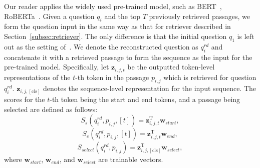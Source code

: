 Our reader applies the widely used pre-trained model, such as BERT~\cite{devlin2018bert}, RoBERTa~\cite{liu2019roberta}. Given a question $q_i$ and the top $T$ previously retrieved passages, we form the question input in the same way as that for retriever described in Section~\ref{subsec:retriever}. The only difference is that the initial question $q_1$ is left out as the setting of~\cite{qu2020open}. We denote the reconstructed question as $q_i^{rd}$ and concatenate it with a retrieved passage to form the sequence as the input for the pre-trained model. Specifically, let $\mathbf{z}_{i,j,t}$ be the outputted token-level representations of the $t$-th token in the passage $p_{i,j}$ which is retrieved for question $q_i^{rd}$. $\mathbf{z}_{i,j,[\mathrm{cls}]}$ denotes the sequence-level representation for the input sequence. The scores for the $t$-th token being the start and end tokens, and a passage being selected are defined as follows:
\begin{equation}\label{eq:score_reader1}
    S_{s}(q_{i}^{rd},p_{i,j},[t]) = \mathbf{z}_{i,j,t}^\mathrm{T}\mathbf{w}_{start},
\end{equation}
\begin{equation}\label{eq:score_reader2}
    S_{e}(q_{i}^{rd},p_{i,j},[t]) = \mathbf{z}_{i,j,t}^\mathrm{T}\mathbf{w}_{end},
\end{equation}
\begin{equation}\label{eq:score_select}
    S_{select}(q_{i}^{rd},p_{i,j})=\mathbf{z}_{i,j,[\mathrm{cls}]}^\mathrm{T}\mathbf{w}_{select},
\end{equation}
where $\mathbf{w}_{start}$, $\mathbf{w}_{end}$, and $\mathbf{w}_{select}$ are trainable vectors.

